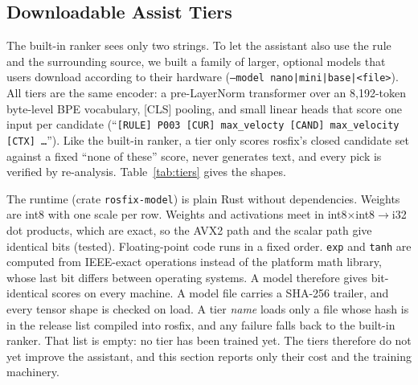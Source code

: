 \documentclass[conference]{IEEEtran}
\newcommand{\code}[1]{\texttt{#1}}
\begin{document}
\subsection{Downloadable Assist Tiers}
\label{sec:tiers}

The built-in ranker sees only two strings. To let the assistant also use the rule and the
surrounding source, we built a family of larger, optional models that users download according to
their hardware (\code{--model nano|mini|base|<file>}). All tiers are the same encoder: a
pre-LayerNorm transformer over an 8,192-token byte-level BPE vocabulary, [CLS] pooling, and small
linear heads that score one input per candidate (``\code{[RULE] P003 [CUR] max\_velocty [CAND]
max\_velocity [CTX] \ldots}''). Like the built-in ranker, a tier only scores rosfix's closed
candidate set against a fixed ``none of these'' score, never generates text, and every pick is
verified by re-analysis. Table~\ref{tab:tiers} gives the shapes.

The runtime (crate \code{rosfix-model}) is plain Rust without dependencies. Weights are int8 with
one scale per row. Weights and activations meet in int8$\times$int8$\to$i32 dot products, which
are exact, so the AVX2 path and the scalar path give identical bits (tested). Floating-point code
runs in a fixed order. \code{exp} and \code{tanh} are computed from IEEE-exact operations instead
of the platform math library, whose last bit differs between operating systems. A model therefore
gives bit-identical scores on every machine. A model file carries a SHA-256 trailer, and every
tensor shape is checked on load. A tier \emph{name} loads only a file whose hash is in the release
list compiled into rosfix, and any failure falls back to the built-in ranker. That list is empty:
no tier has been trained yet. The tiers therefore do not yet improve the assistant, and this
section reports only their cost and the training machinery.
\end{document}
